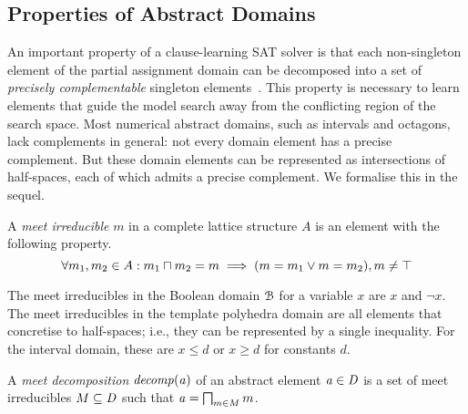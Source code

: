 \subsection{Properties of Abstract Domains}
%
An important property of a clause-learning SAT solver is that each
non-singleton element of the partial assignment domain can be 
decomposed into a set of \textit{precisely complementable} singleton
elements~\cite{dhk2013-popl}.  This property is necessary to learn elements that guide the model search away from the
conflicting region of the search space.  
%
Most numerical abstract domains, such as intervals and octagons, lack
complements in general: not every domain element has a
precise complement.  But these domain elements can be represented
as intersections of half-spaces, each of which admits a precise complement.
We formalise this in the sequel.
%
\begin{definition} 
A \emph{meet irreducible} $m$ in a complete lattice 
structure $A$ is an element with the following property.
\begin{equation}
\forall m_1, m_2 \in A: m_1 \sqcap m_2 = m \implies (m = m_1 \lor m = m_2), m \neq \top  
\end{equation}
\end{definition}
%
The meet irreducibles in the Boolean domain $\mathcal{B}$ 
for a variable $x$ are $x$ and $\neg x$. The meet 
irreducibles in the template polyhedra domain are all elements 
that concretise to half-spaces; i.e., they can be represented 
by a single inequality. For the interval domain, these are 
$x \leq d$ or $x \geq d$ for constants $d$.
%
\begin{definition}
A \emph{meet decomposition} ${\mathit{decomp}}(\mathit{a})$ of an abstract
element $\mathit{a} \in \mathit{D}$ is a set of meet irreducibles $M \subseteq \mathit{D}$ such that 
$\mathit{a}=\bigsqcap_{m\in M} m$.
\end{definition}

